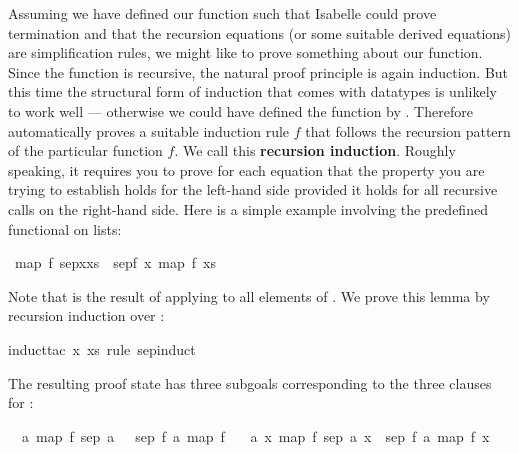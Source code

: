%
\begin{isabellebody}%
\def\isabellecontext{Induction}%
%
\begin{isamarkuptext}%
Assuming we have defined our function such that Isabelle could prove
termination and that the recursion equations (or some suitable derived
equations) are simplification rules, we might like to prove something about
our function. Since the function is recursive, the natural proof principle is
again induction. But this time the structural form of induction that comes
with datatypes is unlikely to work well --- otherwise we could have defined the
function by . Therefore  automatically
proves a suitable induction rule $f$ that follows the
recursion pattern of the particular function $f$. We call this
\textbf{recursion induction}. Roughly speaking, it
requires you to prove for each  equation that the property
you are trying to establish holds for the left-hand side provided it holds
for all recursive calls on the right-hand side. Here is a simple example
involving the predefined  functional on lists:%
\end{isamarkuptext}%
\ {\isachardoublequote}map\ f\ {\isacharparenleft}sep{\isacharparenleft}x{\isacharcomma}xs{\isacharparenright}{\isacharparenright}\ {\isacharequal}\ sep{\isacharparenleft}f\ x{\isacharcomma}\ map\ f\ xs{\isacharparenright}{\isachardoublequote}%
\begin{isamarkuptxt}%
\noindent
Note that 
is the result of applying  to all elements of . We prove
this lemma by recursion induction over :%
\end{isamarkuptxt}%
induct{\isacharunderscore}tac\ x\ xs\ rule{\isacharcolon}\ sep{\isachardot}induct{\isacharparenright}%
\begin{isamarkuptxt}%
\noindent
The resulting proof state has three subgoals corresponding to the three
clauses for :
\begin{isabelle}%
\ {}{\isachardot}\ {\isasymAnd}a{\isachardot}\ map\ f\ {\isacharparenleft}sep\ {\isacharparenleft}a{\isacharcomma}\ {\isacharbrackleft}{\isacharbrackright}{\isacharparenright}{\isacharparenright}\ {\isacharequal}\ sep\ {\isacharparenleft}f\ a{\isacharcomma}\ map\ f\ {\isacharbrackleft}{\isacharbrackright}{\isacharparenright}\isanewline
\ {}{\isachardot}\ {\isasymAnd}a\ x{\isachardot}\ map\ f\ {\isacharparenleft}sep\ {\isacharparenleft}a{\isacharcomma}\ {\isacharbrackleft}x{\isacharbrackright}{\isacharparenright}{\isacharparenright}\ {\isacharequal}\ sep\ {\isacharparenleft}f\ a{\isacharcomma}\ map\ f\ {\isacharbrackleft}x{\isacharbrackright}{\isacharparenright}\isanewline

\end{isabelle}
\end{isamarkuptxt}
\end{isabellebody}
